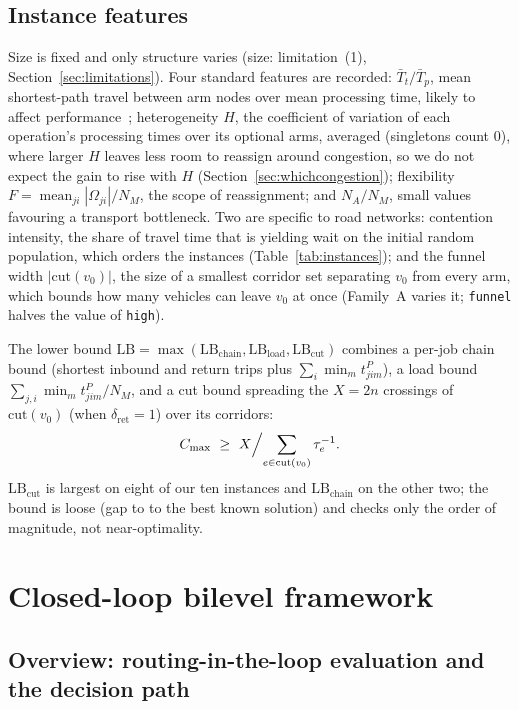 \subsection{Instance features}
\label{sec:features}

Size is fixed and only structure varies (size: limitation~(1), Section~\ref{sec:limitations}).
Four standard features are recorded: $\bar{T}_t/\bar{T}_p$, mean shortest-path travel between arm nodes over mean processing time, likely to affect performance~\cite{xin2025review}; heterogeneity $H$, the coefficient of variation of each operation's processing times over its optional arms, averaged (singletons count $0$), where larger $H$ leaves less room to reassign around congestion, so we do not expect the gain to rise with $H$ (Section~\ref{sec:whichcongestion}); flexibility $F=\operatorname{mean}_{ji}|\Omega_{ji}|/N_M$, the scope of reassignment; and $N_A/N_M$, small values favouring a transport bottleneck.
Two are specific to road networks: contention intensity, the share of travel time that is yielding wait on the initial random population, which orders the instances (Table~\ref{tab:instances}); and the funnel width $|\mathrm{cut}(v_0)|$, the size of a smallest corridor set separating $v_0$ from every arm, which bounds how many vehicles can leave $v_0$ at once (Family~A varies it; \texttt{funnel} halves the value of \texttt{high}).

The lower bound $\mathrm{LB}=\max(\mathrm{LB}_{\text{chain}},\mathrm{LB}_{\text{load}},\mathrm{LB}_{\text{cut}})$ combines a per-job chain bound (shortest inbound and return trips plus $\sum_i \min_m t^P_{jim}$), a load bound $\sum_{j,i}\min_m t^P_{jim}/N_M$, and a cut bound spreading the $X=2n$ crossings of $\mathrm{cut}(v_0)$ (when $\delta_{\mathrm{ret}}=1$) over its corridors:
\begin{equation}
\label{eq:lbcut}
C_{\max}\ \ge\ X\Bigl/\sum_{e\in \mathrm{cut}(v_0)}\tau_e^{-1}.
\end{equation}
$\mathrm{LB}_{\text{cut}}$ is largest on eight of our ten instances and $\mathrm{LB}_{\text{chain}}$ on the other two; the bound is loose (gap \LBGapLo{} to \LBGapHi{} to the best known solution) and checks only the order of magnitude, not near-optimality.

\section{Closed-loop bilevel framework}
\label{sec:Chapter_IV}
\subsection{Overview: routing-in-the-loop evaluation and the decision path}
\label{sec:overview}

